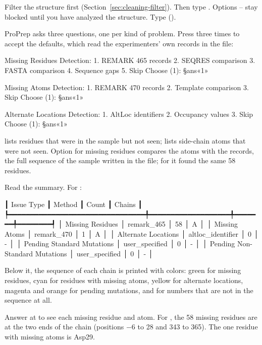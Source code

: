 \begin{steps}
  \item Filter the structure first (Section~\ref{sec:cleaning-filter}). Then
        type . Options -- stay blocked until you have
        analyzed the structure. Type 
        ().
  \item ProPrep asks three questions, one per kind of problem. Press
         three times to accept the defaults, which read the
        experimenters' own records in the file:
\begin{screen}
Missing Residues Detection:
1. REMARK 465 records
2. SEQRES comparison
3. FASTA comparison
4. Sequence gaps
5. Skip
Choose (1): §ans«1»

Missing Atoms Detection:
1. REMARK 470 records
2. Template comparison
3. Skip
Choose (1): §ans«1»

Alternate Locations Detection:
1. AltLoc identifiers
2. Occupancy values
3. Skip
Choose (1): §ans«1»
\end{screen}
         lists residues that were in the sample but not seen;
         lists side-chain atoms that were not seen. Option
         for missing residues compares the atoms with the
         records, the full sequence of the sample written in the
        file; for  it found the same 58 residues.
  \item Read the summary. For :
\begin{screen}
┃ Issue Type                     ┃ Method            ┃ Count ┃ Chains ┃
┡━━━━━━━━━━━━━━━━━━━━━━━━━━━━━━━━╇━━━━━━━━━━━━━━━━━━━╇━━━━━━━╇━━━━━━━━┩
│ Missing Residues               │ remark_465        │ 58    │ A      │
│ Missing Atoms                  │ remark_470        │ 1     │ A      │
│ Alternate Locations            │ altloc_identifier │ 0     │ -      │
│ Pending Standard Mutations     │ user_specified    │ 0     │ -      │
│ Pending Non-Standard Mutations │ user_specified    │ 0     │ -      │
\end{screen}
        Below it, the sequence of each chain is printed with colors: green
        for missing residues, cyan for residues with missing atoms, yellow for
        alternate locations, magenta and orange for pending mutations, and
        \prompt{-} for numbers that are not in the sequence at all.
  \item Answer  at  to see each missing
        residue and atom. For , the 58 missing residues are at the
        two ends of the chain (positions $-6$ to 28 and 343 to 365). The one
        residue with missing atoms is Asp29.
\end{steps}


